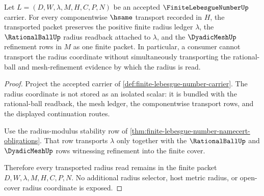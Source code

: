 \begin{theorem}
\label{thm:finite-lebesgue-number-radius-transport}
Let $L=(D,W,\lambda,M,H,C,P,N)$ be an accepted $\FiniteLebesgueNumberUp$ carrier. For every componentwise $\hsame$ transport recorded in $H$, the transported packet preserves the positive finite radius ledger $\lambda$, the $\RationalBallUp$ radius readback attached to $\lambda$, and the $\DyadicMeshUp$ refinement rows in $M$ as one finite packet. In particular, a consumer cannot transport the radius coordinate without simultaneously transporting the rational-ball and mesh-refinement evidence by which the radius is read.
\end{theorem}
\begin{proof}
Project the accepted carrier of \autoref{def:finite-lebesgue-number-carrier}. The radius coordinate is not stored as an isolated scalar: it is bundled with the rational-ball readback, the mesh ledger, the componentwise transport rows, and the displayed continuation routes.

Use the radius-modulus stability row of \autoref{thm:finite-lebesgue-number-namecert-obligations}. That row transports $\lambda$ only together with the $\RationalBallUp$ and $\DyadicMeshUp$ rows witnessing refinement into the finite cover.

Therefore every transported radius read remains in the finite packet $D,W,\lambda,M,H,C,P,N$. No additional radius selector, host metric radius, or open-cover radius coordinate is exposed.
\end{proof}

